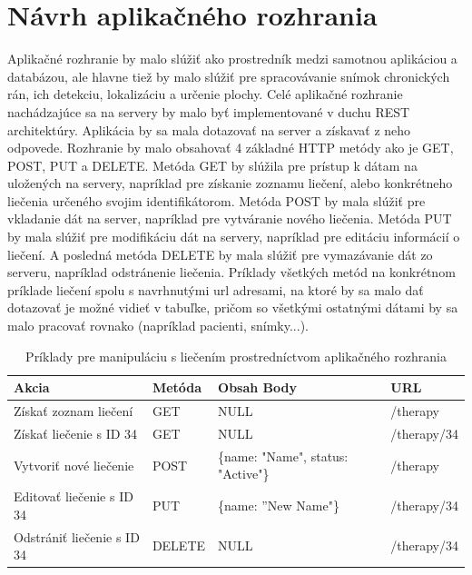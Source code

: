 \section{Návrh aplikačného rozhrania}
Aplikačné rozhranie by malo slúžiť ako prostredník medzi samotnou aplikáciou a databázou, ale hlavne tiež by malo slúžiť pre spracovávanie snímok chronických rán, ich detekciu, lokalizáciu a určenie plochy. Celé aplikačné rozhranie nachádzajúce sa na servery by malo byť implementované v duchu REST architektúry. Aplikácia by sa mala dotazovať na server a získavať z neho odpovede. Rozhranie by malo obsahovať 4 základné HTTP metódy ako je GET, POST, PUT a DELETE. Metóda GET by slúžila pre prístup k dátam na uložených na servery, napríklad pre získanie zoznamu liečení, alebo konkrétneho liečenia určeného svojim identifikátorom. Metóda POST by mala slúžiť pre vkladanie dát na server, napríklad pre vytváranie nového liečenia. Metóda PUT by mala slúžiť pre modifikáciu dát na servery, napríklad pre editáciu informácií o liečení. A posledná metóda DELETE by mala slúžiť pre vymazávanie dát zo serveru, napríklad odstránenie liečenia. Príklady všetkých metód na konkrétnom príklade liečení spolu s navrhnutými url adresami, na ktoré by sa malo dať dotazovať je možné vidieť v tabuľke, pričom so všetkými ostatnými dátami by sa malo pracovať rovnako (napríklad pacienti, snímky...).
\begin{table}[h]
\centering
\begin{tabular}{|l|l|l|l|}
\hline
Akcia                      & Metóda & Obsah Body                         & URL         \\ \hline
Získať zoznam liečení      & GET    & NULL                               & /therapy    \\ \hline
Získať liečenie s ID 34    & GET    & NULL                               & /therapy/34 \\ \hline
Vytvoriť nové liečenie     & POST   & \{name: "Name", status: "Active"\} & /therapy    \\ \hline
Editovať liečenie s ID 34  & PUT    & \{name: ''New Name"\}              & /therapy/34  \\ \hline
Odstrániť liečenie s ID 34 & DELETE & NULL                               & /therapy/34  \\ \hline
\end{tabular}
\caption{Príklady pre manipuláciu s liečením prostredníctvom aplikačného rozhrania}
\label{tab:rest-example}
\end{table}

